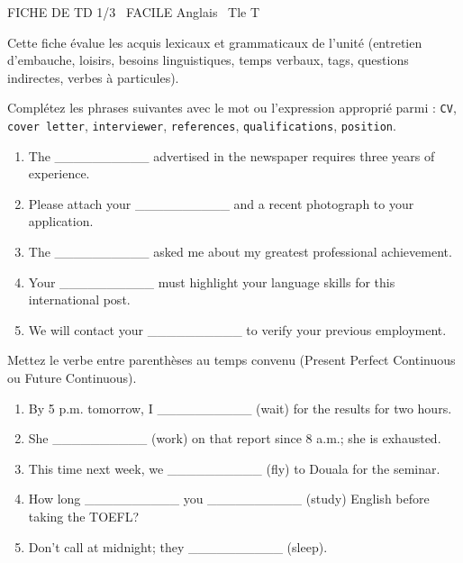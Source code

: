 \documentclass[11pt]{article}
\begin{document}
\begin{tcolorbox}[enhanced,colback=popink,colframe=popink,arc=10pt,boxrule=0pt,left=12pt,right=12pt,top=9pt,bottom=9pt]
{\color{white}\popxbold\small FICHE DE TD 1/3 \textbullet\ FACILE \hfill Anglais \textbullet\ Tle T\par}
\end{tcolorbox}
\vspace{4pt}
Cette fiche évalue les acquis lexicaux et grammaticaux de l'unité (entretien d'embauche, loisirs, besoins linguistiques, temps verbaux, tags, questions indirectes, verbes à particules).

\begin{exercice}
Complétez les phrases suivantes avec le mot ou l'expression approprié parmi : \texttt{CV}, \texttt{cover letter}, \texttt{interviewer}, \texttt{references}, \texttt{qualifications}, \texttt{position}.
\begin{enumerate}
    \item The \_\_\_\_\_\_\_\_\_\_ advertised in the newspaper requires three years of experience.
    \item Please attach your \_\_\_\_\_\_\_\_\_\_ and a recent photograph to your application.
    \item The \_\_\_\_\_\_\_\_\_\_ asked me about my greatest professional achievement.
    \item Your \_\_\_\_\_\_\_\_\_\_ must highlight your language skills for this international post.
    \item We will contact your \_\_\_\_\_\_\_\_\_\_ to verify your previous employment.
\end{enumerate}
\end{exercice}

\begin{exercice}
Mettez le verbe entre parenthèses au temps convenu (Present Perfect Continuous ou Future Continuous).
\begin{enumerate}
    \item By 5 p.m. tomorrow, I \_\_\_\_\_\_\_\_\_\_ (wait) for the results for two hours.
    \item She \_\_\_\_\_\_\_\_\_\_ (work) on that report since 8 a.m.; she is exhausted.
    \item This time next week, we \_\_\_\_\_\_\_\_\_\_ (fly) to Douala for the seminar.
    \item How long \_\_\_\_\_\_\_\_\_\_ you \_\_\_\_\_\_\_\_\_\_ (study) English before taking the TOEFL?
    \item Don't call at midnight; they \_\_\_\_\_\_\_\_\_\_ (sleep).
\end{enumerate}
\end{exercice}
\end{document}
